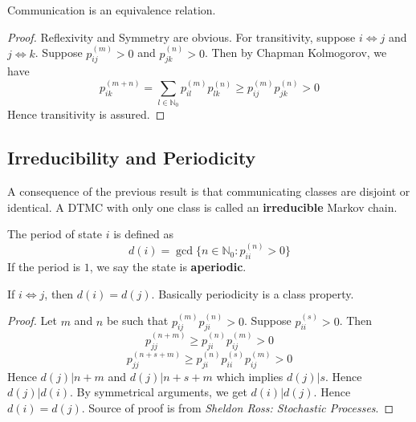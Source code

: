 \documentclass[a4paper,10pt,english]{article}
\begin{document}
\begin{prop}
Communication is an equivalence relation. 
\end{prop}
\begin{proof}
Reflexivity and Symmetry are obvious. For transitivity, suppose $i \iff j$ and $j \iff k$. Suppose $p_{ij}^{(m)} >0$ and $p_{jk}^{(n)} >0$. Then by Chapman Kolmogorov, we have
\[p_{ik}^{(m+n)} = \sum_{l \in \mathbb{N}_0} p_{il}^{(m)}p_{lk}^{(n)} \geq p_{ij}^{(m)}p_{jk}^{(n)} >0  \]
Hence transitivity is assured.
\end{proof}

\subsection{Irreducibility and Periodicity}
A consequence of the previous result is that communicating classes are disjoint or identical. A DTMC with only one class is called an \textbf{irreducible} Markov chain.
\begin{defn}
The period of state $i$ is defined as
\[d(i) = \gcd\{n \in \mathbb{N}_0 : p_{ii}^{(n)} > 0\}\]
If the period is $1$, we say the state is \textbf{aperiodic}.
\end{defn}

\begin{prop}
If $i \iff j$, then $d(i) = d(j)$. Basically periodicity is a class property.
\end{prop}
\begin{proof}
Let $m$ and $n$ be such that $p_{ij}^{(m)}p_{ji}^{(n)} > 0$. Suppose $p_{ii}^{(s)} > 0$. Then
\[ p_{jj}^{(n+m)} \geq p_{ji}^{(n)}p_{ij}^{(m)} > 0 \]
\[ p_{jj}^{(n+s+m)} \geq p_{ji}^{(n)}p_{ii}^{(s)}p_{ij}^{(m)} > 0 \]
Hence $d(j) | n+m$ and $d(j) | n+s+m$ which implies $d(j) | s$. Hence $d(j) | d(i)$. By symmetrical arguments, we get $d(i) | d(j)$. Hence $d(i) = d(j)$.
Source of proof is from \emph{Sheldon Ross: Stochastic Processes}.
\end{proof}
\end{document}
